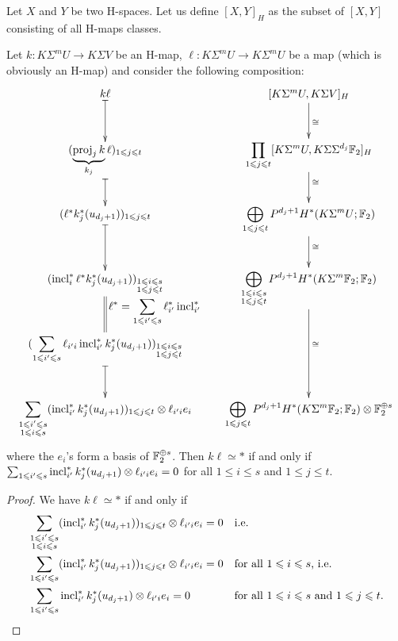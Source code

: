 \begin{defn}
Let $X$ and $Y$ be two H-spaces. Let us define $[X,Y]_H$ as the subset of $[X,Y]$ consisting of all H-maps classes.
\end{defn}

\begin{lem}\label{l:caract retracts}
Let $k:K\Sigma^m U\to K\Sigma V$ be an H-map, $\ell:K\Sigma^m U\to K\Sigma^m U$ be a map (which is obviously an H-map) and consider the following composition:
$$\xymatrix{
k\ell\ar@{|->}[d] &[K\Sigma^m U,K\Sigma V]_H\ar[d]^\cong\\
(\underbrace{\proj_j k}_{k_j}\ell)_{1\leq j\leq t}\ar@{|->}[d] &\displaystyle\prod_{1\leq j\leq t}[K\Sigma^m U,K\Sigma\Sigma^{d_j}\F_2]_H\ar[d]^\cong\\
(\ell^*k_j^*(u_{d_j+1}))_{1\leq j\leq t}\ar@{|->}[d] &\displaystyle\bigoplus_{1\leq j\leq t}P^{d_j+1}H^*(K\Sigma^m U;\F_2)\ar[d]^\cong\\
(\incl_i^*\ell^*k_j^*(u_{d_j+1}))_{\substack{1\leq i\leq s\\ 1\leq j\leq t}}\ar@{=}[d]^{\displaystyle \ell^*=\sum_{1\leq {i'}\leq s}\ell_{i'}^*\incl_{i'}^*} &\displaystyle\bigoplus_{\substack{1\leq i\leq s\\ 1\leq j\leq t}}P^{d_j+1}H^*(K\Sigma^m\F_2;\F_2)\ar[dd]^\cong\\
(\displaystyle\sum_{1\leq {i'}\leq s}\ell_{{i'}i}\incl_{i'}^*k_j^*(u_{d_j+1}))_{\substack{1\leq i\leq s\\ 1\leq j\leq t}}\ar@{|->}[d] &\\
\displaystyle\sum_{\substack{1\leq {i'}\leq s\\ 1\leq i\leq s}}(\incl_{i'}^*k_j^*(u_{d_j+1}))_{1\leq j\leq t}\otimes \ell_{{i'}i}e_i&\displaystyle\bigoplus_{1\leq j\leq t}P^{d_j+1}H^*(K\Sigma^m\F_2;\F_2)\otimes\F_2^{\oplus s}
}$$ where the $e_i$'s form a basis of $\mathbb{F}_2^{\oplus s}$.
Then $k\ell\simeq *$ if and only if $\sum_{1\leqslant i'\leqslant s} \operatorname{incl}_{i'}^*k_j^*(u_{d_j+1})\otimes \ell_{{i'}i}e_i=0$ for all $1\leq i\leq s$ and $1\leq j\leq t$.
\end{lem}

\begin{proof}
We have $k\ell\simeq *$ if and only if 
\begin{align*}
&\sum_{\substack{1\leqslant {i'}\leqslant s\\ 1\leqslant i\leqslant s}}(\operatorname{incl}_{i'}^*k_j^*(u_{d_j+1}))_{1\leqslant j\leqslant t}\otimes \ell_{{i'}i}e_i=0 &&\text{i.e.}\\
&\sum_{1\leqslant {i'}\leqslant s}(\operatorname{incl}_{i'}^*k_j^*(u_{d_j+1}))_{1\leqslant j\leqslant t}\otimes \ell_{{i'}i}e_i=0 &&\text{for all $1\leqslant i\leqslant s$, i.e.}\\
&\sum_{1\leqslant {i'}\leqslant s}\operatorname{incl}_{i'}^*k_j^*(u_{d_j+1})\otimes \ell_{{i'}i}e_i=0 &&\text{for all $1\leqslant i\leqslant s$ and $1\leqslant j\leqslant t$.}
\end{align*}
\end{proof}

